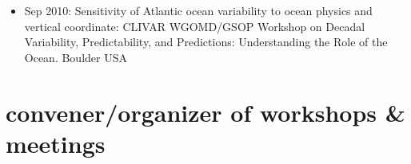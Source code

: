 \documentclass{article}
\begin{document}
\begin{itemize}[leftmargin=*]
\item Sep 2010:  {\sc Sensitivity of Atlantic ocean variability to
    ocean physics and vertical coordinate}: CLIVAR WGOMD/GSOP Workshop
  on Decadal Variability, Predictability, and Predictions:
  Understanding the Role of the Ocean. Boulder USA 




\end{itemize}


\section*{\sc  \color{Maroon}  convener/organizer of workshops \& meetings}
\vspace{-.3cm}
\end{document}
